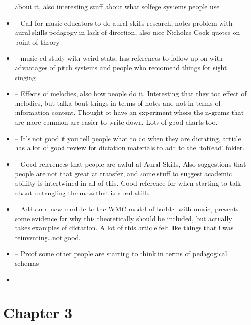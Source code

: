 \documentclass[]{book}
\theoremstyle{definition}
\theoremstyle{definition}
\theoremstyle{definition}
\theoremstyle{remark}
\begin{document}
\begin{itemize}
  about it, also interesting stuff about what solfege systems people use
\item
  \citep{davidbutlerWhyGulfMusic1997a} -- Call for music educators to do
  aural skills research, notes problem with aural skills pedagogy in
  lack of direction, also nice Nicholas Cook quotes on point of theory
\item
  \citep{furbyEffectsPeerTutoring2016} -- music ed study with weird
  stats, has references to follow up on with advantages of pitch systems
  and people who reccomend things for sight singing
\item
  \citep{pembrookInterferenceTranscriptionProcess1986} -- Effects of
  melodies, also how people do it. Interesting that they too effect of
  melodies, but talka bout things in terms of notes and not in terms of
  information content. Thought ot have an experiment where the n-grams
  that are more common are easier to write down. Lots of good charts
  too.
\item
  \citep{paneyEffectDirectingAttention2016} -- It's not good if you tell
  people what to do when they are dictating, article has a lot of good
  review for dictation materials to add to the `toRead' folder.
\item
  \citep{fournierCognitiveStrategiesSightsinging2017a} -- Good
  references that people are awful at Aural Skills, Also suggestions
  that people are not that great at transfer, and some stuff to suggest
  academic abililty is intertwined in all of this. Good reference for
  when starting to talk about untangling the mess that is aural skills.
\item
  \citep[ 1995]{berzWorkingMemoryMusic} -- Add on a new module to the
  WMC model of baddel with music, presents some evidence for why this
  theoretically should be included, but actually takes examples of
  dictation. A lot of this article felt like things that i was
  reinventing\ldots{}not good.
\item
  \citep{atkinsonSomeThoughtsOnTrying} -- Proof some other people are
  starting to think in terms of pedagogical schemas
\item
\end{itemize}

\hypertarget{chapter-3-1}{%
\section{Chapter 3}\label{chapter-3-1}}
\end{document}
